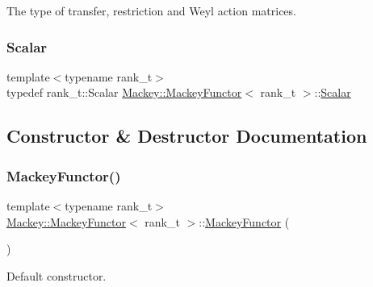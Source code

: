 The type of transfer, restriction and Weyl action matrices. 

\mbox{\label{classMackey_1_1MackeyFunctor_a124b4175216c4cf9a4b67acc78e9246d}} 
\subsubsection{\texorpdfstring{Scalar}{Scalar}}
{\footnotesize\ttfamily template$<$typename rank\+\_\+t$>$ \\
typedef rank\+\_\+t\+::\+Scalar \hyperlink{classMackey_1_1MackeyFunctor}{Mackey\+::\+Mackey\+Functor}$<$ rank\+\_\+t $>$\+::\hyperlink{classMackey_1_1MackeyFunctor_a124b4175216c4cf9a4b67acc78e9246d}{Scalar}}



\subsection{Constructor \& Destructor Documentation}
\mbox{\label{classMackey_1_1MackeyFunctor_a075cd364217700d5f5c2459d4a988a93}} 
\subsubsection{\texorpdfstring{Mackey\+Functor()}{MackeyFunctor()}\hspace{0.1cm}{\footnotesize\ttfamily [1/2]}}
{\footnotesize\ttfamily template$<$typename rank\+\_\+t$>$ \\
\hyperlink{classMackey_1_1MackeyFunctor}{Mackey\+::\+Mackey\+Functor}$<$ rank\+\_\+t $>$\+::\hyperlink{classMackey_1_1MackeyFunctor}{Mackey\+Functor} (\begin{DoxyParamCaption}{ }\end{DoxyParamCaption})\hspace{0.3cm}{\ttfamily [inline]}}



Default constructor. 

